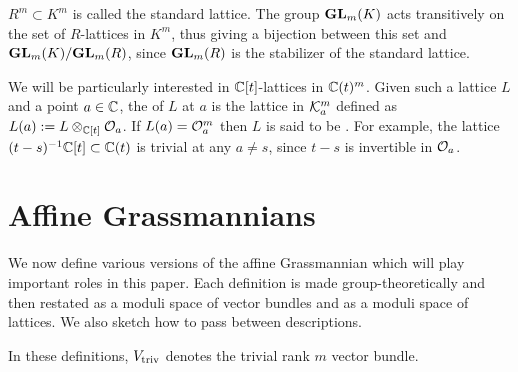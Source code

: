 \documentclass{article}
\begin{document}
\( R^m \subset K^m \) is called the standard lattice. The group \({\mathbf{GL}}_m(K) \) acts transitively on the set of \(R\)-lattices in \(K^m\), thus giving a bijection between this set and \({\mathbf{GL}}_m(K)/{\mathbf{GL}}_m(R)\), since \( {\mathbf{GL}}_m(R) \) is the stabilizer of the standard lattice. 

We will be particularly interested in \(\mathbb C[t]\)-lattices in \( \mathbb C(t)^m\). Given such a lattice \( L \) and a point \( a \in \mathbb C\), the  of \( L \) at \( a \) is the lattice in \(\mathcal K_a^m\) defined as \( L(a) := L \otimes_{\mathbb C[t]} \mathcal O_a \). 
If \(L(a) = \mathcal O_a^m\) then \(L\) is said to be . 
For example, the lattice \((t-s)^{-1}\mathbb C[t] \subset \mathbb C(t)\) is trivial at any \(a\ne s\), since \( t-s \) is invertible in \( \mathcal O_a\). 

\section{Affine Grassmannians}\label{s:affgrs}
% 
We now define various versions of the affine Grassmannian which will play important roles in this paper. 
% 
Each definition is made group-theoretically and then restated as a moduli space of vector bundles and as a moduli space of lattices.
% 
We also sketch how to pass between descriptions.  

In these definitions, \( V_{\mathrm{triv}}\) denotes the trivial rank \( m \) vector bundle. 
\end{document}
